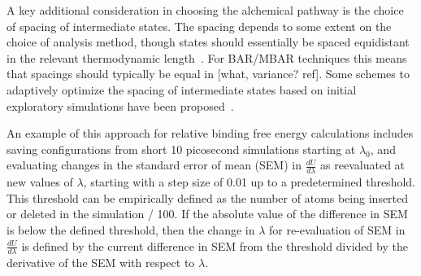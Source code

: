\documentclass[9pt,bestpractices]{livecoms}
\begin{document}
A key additional consideration in choosing the alchemical pathway is the choice of spacing of intermediate states.
The spacing depends to some extent on the choice of analysis method, though states should essentially be spaced equidistant in the relevant thermodynamic length~\cite{}.
For BAR/MBAR techniques this means that spacings should typically be equal in [what, variance? ref].
Some schemes to adaptively optimize the spacing of intermediate states based on initial exploratory simulations have been proposed~\cite{}.

An example of this approach for relative binding free energy calculations includes saving configurations from short 10 picosecond simulations starting at $\lambda_0$, and evaluating changes in the standard error of mean (SEM) in $\frac{dU}{d\lambda}$ as reevaluated at new values of $\lambda$, starting with a step size of 0.01 up to a predetermined threshold.
This threshold can be empirically defined as the number of atoms being inserted or deleted in the simulation / 100.
If the absolute value of the difference in SEM is below the defined threshold, then the change in $\lambda$ for re-evaluation of SEM in $\frac{dU}{d\lambda}$ is defined by the current difference in SEM from the threshold divided by the derivative of the SEM with respect to $\lambda$.


%
%
\end{document}
